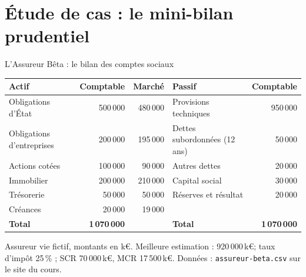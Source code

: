 \documentclass[10pt,aspectratio=169]{beamer}
\newcommand{\keur}{\,k\euro}
\begin{document}
\section{Étude de cas : le mini-bilan prudentiel}

\begin{frame}{L'Assureur Bêta : le bilan des comptes sociaux}
\begin{table}
\centering
\small
\begin{tabular}{lrr@{\qquad}lr}
\toprule
\textbf{Actif} & \textbf{Comptable} & \textbf{Marché} & \textbf{Passif} & \textbf{Comptable} \\
\midrule
Obligations d'État        & 500\,000 & 480\,000 & Provisions techniques       & 950\,000 \\
Obligations d'entreprises & 200\,000 & 195\,000 & Dettes subordonnées (12 ans) & 50\,000 \\
Actions cotées            & 100\,000 &  90\,000 & Autres dettes               &  20\,000 \\
Immobilier                & 200\,000 & 210\,000 & Capital social              &  30\,000 \\
Trésorerie                &  50\,000 &  50\,000 & Réserves et résultat        &  20\,000 \\
Créances                  &  20\,000 &  19\,000 &                             &          \\
\midrule
\textbf{Total}            & \textbf{1\,070\,000} & & \textbf{Total} & \textbf{1\,070\,000} \\
\bottomrule
\end{tabular}
\end{table}
\small Assureur vie fictif, montants en k\euro. Meilleure estimation : 920\,000\keur ; taux d'impôt
25\,\% ; SCR 70\,000\keur, MCR 17\,500\keur. Données : \texttt{assureur-beta.csv} sur le site du cours.
\end{frame}
\end{document}
